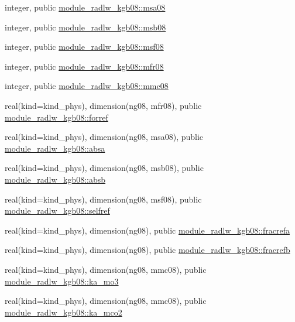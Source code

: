 \begin{DoxyCompactItemize}
\item 
integer, public \hyperlink{namespacemodule__radlw__kgb08_a74e4bd8f4b00d0ff6bae1a39d9bddd3b}{module\+\_\+radlw\+\_\+kgb08\+::msa08}
\item 
integer, public \hyperlink{group__module__radlw__main_ga3dd391fcce47d3aca3512bbfd946807b}{module\+\_\+radlw\+\_\+kgb08\+::msb08}
\item 
integer, public \hyperlink{group__module__radlw__main_ga7db22d5a0ece1b1f10cbf64ae1181a09}{module\+\_\+radlw\+\_\+kgb08\+::msf08}
\item 
integer, public \hyperlink{group__module__radlw__main_gabfaf0cad62f8ae42564f8127198d48f0}{module\+\_\+radlw\+\_\+kgb08\+::mfr08}
\item 
integer, public \hyperlink{group__module__radlw__main_ga9e3bfc1880221c18fa07817eb62bcc47}{module\+\_\+radlw\+\_\+kgb08\+::mmc08}
\item 
real(kind=kind\+\_\+phys), dimension(ng08, mfr08), public \hyperlink{group__module__radlw__main_ga8427ec5170f6a61a008a8580be6fe5ec}{module\+\_\+radlw\+\_\+kgb08\+::forref}
\item 
real(kind=kind\+\_\+phys), dimension(ng08, msa08), public \hyperlink{group__module__radlw__main_gaba1018958264bbc6fbf7f190fea91fa5}{module\+\_\+radlw\+\_\+kgb08\+::absa}
\item 
real(kind=kind\+\_\+phys), dimension(ng08, msb08), public \hyperlink{group__module__radlw__main_ga23d4352fcafb0394d723e2f080a84ece}{module\+\_\+radlw\+\_\+kgb08\+::absb}
\item 
real(kind=kind\+\_\+phys), dimension(ng08, msf08), public \hyperlink{group__module__radlw__main_ga2c38561d26f86f7ae515b433843c4e5d}{module\+\_\+radlw\+\_\+kgb08\+::selfref}
\item 
real(kind=kind\+\_\+phys), dimension(ng08), public \hyperlink{group__module__radlw__main_gad1a59ffb362cd72537df9c1916c07621}{module\+\_\+radlw\+\_\+kgb08\+::fracrefa}
\item 
real(kind=kind\+\_\+phys), dimension(ng08), public \hyperlink{group__module__radlw__main_ga0ae7e4c01034a2b95c03b041537b962e}{module\+\_\+radlw\+\_\+kgb08\+::fracrefb}
\item 
real(kind=kind\+\_\+phys), dimension(ng08, mmc08), public \hyperlink{group__module__radlw__main_ga7dec65e880c278f44419c1ae01490eae}{module\+\_\+radlw\+\_\+kgb08\+::ka\+\_\+mo3}
\item 
real(kind=kind\+\_\+phys), dimension(ng08, mmc08), public \hyperlink{group__module__radlw__main_ga0fcd13503b3253ec6aab0aa52056f634}{module\+\_\+radlw\+\_\+kgb08\+::ka\+\_\+mco2}

\end{DoxyCompactItemize}
